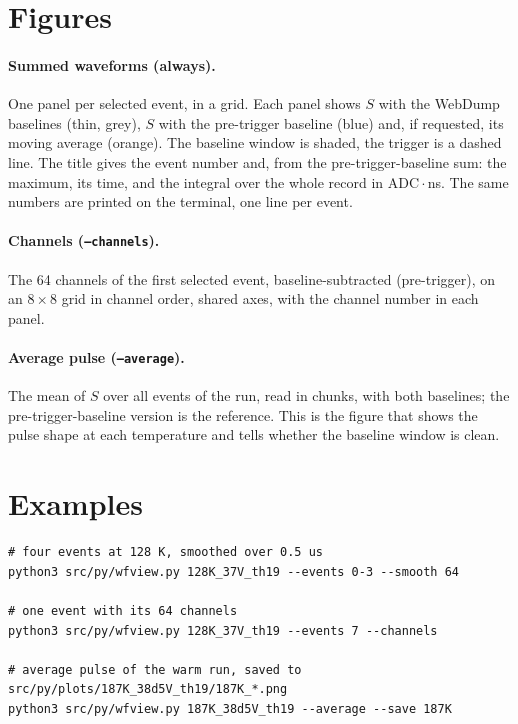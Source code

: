 \documentclass[11pt]{article}
\newcommand{\code}[1]{\texttt{#1}}
\begin{document}
\section{Figures}

\paragraph{Summed waveforms (always).} One panel per selected event, in a
grid. Each panel shows $S$ with the WebDump baselines (thin, grey), $S$ with
the pre-trigger baseline (blue) and, if requested, its moving average
(orange). The baseline window is shaded, the trigger is a dashed line. The
title gives the event number and, from the pre-trigger-baseline sum: the
maximum, its time, and the integral over the whole record in ADC\,$\cdot$\,ns.
The same numbers are printed on the terminal, one line per event.

\paragraph{Channels (\code{--channels}).} The 64 channels of the first
selected event, baseline-subtracted (pre-trigger), on an $8 \times 8$ grid
in channel order, shared axes, with the channel number in each panel.

\paragraph{Average pulse (\code{--average}).} The mean of $S$ over all events
of the run, read in chunks, with both baselines; the pre-trigger-baseline
version is the reference. This is the figure that shows the pulse shape at
each temperature and tells whether the baseline window is clean.

\section{Examples}

\begin{lstlisting}
# four events at 128 K, smoothed over 0.5 us
python3 src/py/wfview.py 128K_37V_th19 --events 0-3 --smooth 64

# one event with its 64 channels
python3 src/py/wfview.py 128K_37V_th19 --events 7 --channels

# average pulse of the warm run, saved to src/py/plots/187K_38d5V_th19/187K_*.png
python3 src/py/wfview.py 187K_38d5V_th19 --average --save 187K
\end{lstlisting}
\end{document}
